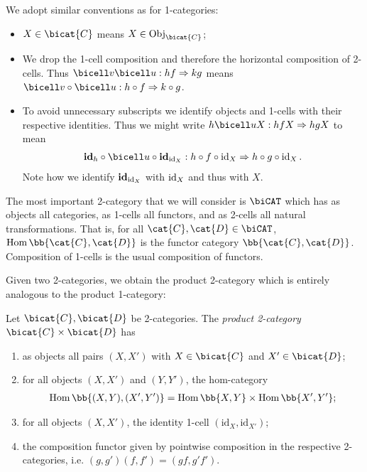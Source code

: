 \begin{notation}
  We adopt similar conventions as for 1-categories:
  \begin{itemize}
    \item $X\in\bicat{C}$ means $X\in\Obj_{\bicat{C}}$;
    \item We drop the 1-cell composition and therefore the horizontal
      composition of 2-cells. Thus $\bicell v\bicell u:hf\Rightarrow kg$ means
      $\bicell v\circ\bicell u:h\circ f\Rightarrow k\circ g$.
    \item To avoid unnecessary subscripts we identify objects and 1-cells with their
      respective identities. Thus we might write $h\bicell uX:hfX\Rightarrow hgX$
      to mean
      \begin{align*}
        \textbf{id}_h\circ\bicell u\circ\textbf{id}_{\id_X}:h\circ f\circ\id_X\Rightarrow h\circ g\circ\id_X.
      \end{align*}
      Note how we identify $\textbf{id}_{\operatorname{id}_X}$ with $\operatorname{id}_X$ and thus with $X$.
  \end{itemize}
\end{notation}


\begin{example}
  The most important 2-category that we will consider is $\biCAT$ which has as
  objects all categories, as 1-cells all functors, and as 2-cells all natural transformations.
  That is, for all $\cat{C},\cat{D}\in\biCAT$, $\Hom\bb{\cat{C},\cat{D}}$ is the functor
  category $\bb{\cat{C},\cat{D}}$. Composition of 1-cells is the usual composition of functors.
\end{example}

Given two 2-categories, we obtain the product 2-category which is entirely analogous to the
product 1-category:

\begin{definition}\label{def:product_2category}
  Let $\bicat{C},\bicat{D}$ be 2-categories. The \emph{product 2-category} $\bicat{C}\times\bicat{D}$ has
  \begin{enumerate}
    \item as objects all pairs $(X,X')$ with $X\in\bicat{C}$ and $X'\in\bicat{D}$;
    \item for all objects $(X,X')$ and $(Y,Y')$, the hom-category
      \begin{align*}
        \Hom\bb{(X,Y),(X',Y')} = \Hom\bb{X,Y}\times\Hom\bb{X',Y'};
      \end{align*}
    \item for all objects $(X,X')$, the identity 1-cell $(\text{id}_X,\text{id}_{X'})$;
    \item the composition functor given by pointwise composition in the respective
      2-categories, i.e. $(g,g')(f,f')=(gf,g'f')$.
  \end{enumerate}
\end{definition}

